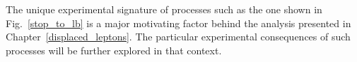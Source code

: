 

The unique experimental signature of processes such as the one shown in Fig.~\ref{stop_to_lb} is a major motivating factor behind the analysis presented in Chapter~\ref{displaced_leptons}. The particular experimental consequences of such processes will be further explored in that context.

\pagebreak